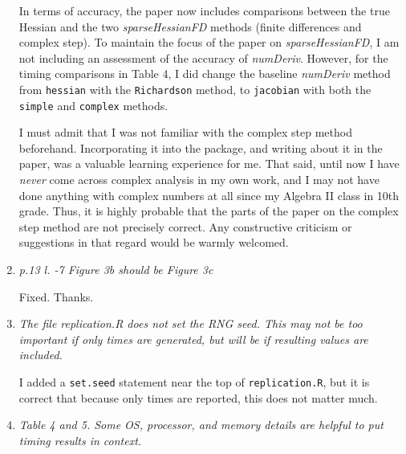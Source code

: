 \documentclass{article}
\newcommand{\pkg}[1]{\emph{#1}}
\newcommand{\filename}[1]{\texttt{#1}}
\newcommand{\code}[1]{\texttt{#1}}
\newcommand{\func}[1]{\code{#1}}
\newcommand{\class}[1]{\textsl{#1}}
\newcommand{\method}[1]{\func{#1}}
\newenvironment{revQuote}{\itshape}{\vspace{\baselineskip}}
\newenvironment{response}{\normalfont}{\vspace{\baselineskip}}
\begin{document}
\begin{enumerate}[align=left]
\begin{response}
In terms of accuracy, the paper now includes comparisons between the true
Hessian and the two \class{sparseHessianFD} methods (finite differences
and complex step). To maintain the focus of the paper on
\pkg{sparseHessianFD}, I am not including an assessment of the accuracy of
\pkg{numDeriv}.  However, for the
timing comparisons in Table 4, I did
change the baseline \pkg{numDeriv} method from \func{hessian} with the
\method{Richardson} method, to \func{jacobian} with both the
\method{simple} and 
\method{complex} methods.

I must admit that I was not familiar with the complex step method
beforehand.  Incorporating it into the package, and writing about it
in the paper, was a valuable learning experience for me. That said,
until now I have \emph{never} come across complex analysis in my own work, and I
may not have done anything with complex numbers at all since my
Algebra II class in 10th grade. Thus, it is highly probable that the parts
of the paper on the complex step method are not precisely correct.
Any constructive criticism or suggestions in that regard would be
warmly welcomed.

\end{response}

\item \begin{revQuote}
 p.13  l. -7  Figure 3b  should be Figure 3c
  \end{revQuote}

\begin{response}
  Fixed.  Thanks.
\end{response}

\item \begin{revQuote}
 The file replication.R does not set the RNG seed. This may not be too
important if only times are generated, but will be if resulting values are
included.
    
  \end{revQuote}

\begin{response}
  I added a \func{set.seed} statement near the top of
  \filename{replication.R}, but it is correct that because only
  times are reported, this does not matter much.
\end{response}


\item \begin{revQuote}
Table 4 and 5. Some OS, processor, and memory details are helpful to put
timing results in context.
  \end{revQuote}


\end{enumerate}
\end{document}
